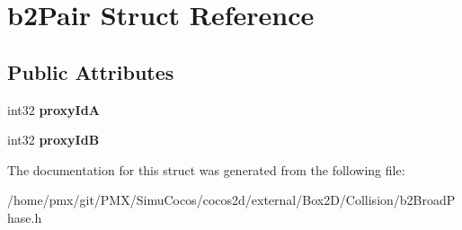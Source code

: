 \hypertarget{structb2Pair}{}\section{b2\+Pair Struct Reference}
\label{structb2Pair}
\subsection*{Public Attributes}
\begin{DoxyCompactItemize}
\item 
\mbox{\label{structb2Pair_abae3df5e877cf0c4611334e3eec4b84c}} 
int32 {\bfseries proxy\+IdA}
\item 
\mbox{\label{structb2Pair_af2bd888ccb34535ab9126497349da749}} 
int32 {\bfseries proxy\+IdB}
\end{DoxyCompactItemize}


The documentation for this struct was generated from the following file\+:\begin{DoxyCompactItemize}
\item 
/home/pmx/git/\+P\+M\+X/\+Simu\+Cocos/cocos2d/external/\+Box2\+D/\+Collision/b2\+Broad\+Phase.\+h\end{DoxyCompactItemize}
